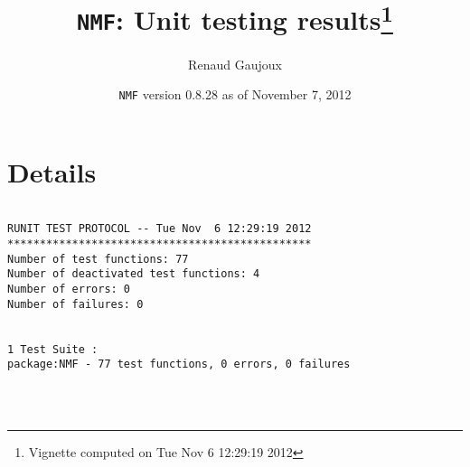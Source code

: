\documentclass[10pt]{article}
\author{Renaud Gaujoux}
\title{\texttt{NMF}: Unit testing results\footnote{Vignette computed  on Tue Nov  6 12:29:19 2012}}
\date{\texttt{NMF} version 0.8.28 as of November  7, 2012}
\begin{document}
\maketitle

\section{Details}
\begin{verbatim}

RUNIT TEST PROTOCOL -- Tue Nov  6 12:29:19 2012 
*********************************************** 
Number of test functions: 77 
Number of deactivated test functions: 4 
Number of errors: 0 
Number of failures: 0 

 
1 Test Suite : 
package:NMF - 77 test functions, 0 errors, 0 failures




\end{verbatim}
\end{document}
